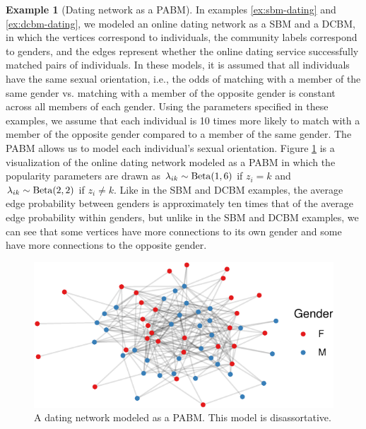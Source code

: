 \documentclass[
  12pt,
]{article}
\theoremstyle{definition}
\theoremstyle{definition}
\newtheorem{example}{Example}[section]
\theoremstyle{definition}
\theoremstyle{definition}
\theoremstyle{remark}
\begin{document}
\begin{example}[Dating network as a PABM]
\label{ex:pabm-dating}
In examples \ref{ex:sbm-dating} and \ref{ex:dcbm-dating}, we modeled an online dating network as a SBM and a DCBM, in which the vertices correspond to individuals, the community labels correspond to genders, and the edges represent whether the online dating service successfully matched pairs of individuals. 
In these models, it is assumed that all individuals have the same sexual orientation, i.e., the odds of matching with a member of the same gender vs. matching with a member of the opposite gender is constant across all members of each gender. 
Using the parameters specified in these examples, we assume that each individual is 10 times more likely to match with a member of the opposite gender compared to a member of the same gender. 
The PABM allows us to model each individual's sexual orientation. 
Figure \ref{fig:dating-pabm} is a visualization of the online dating network modeled as a PABM in which the popularity parameters are drawn as $\lambda_{ik} \sim \mathrm{Beta}(1, 6)$ if $z_i = k$ and $\lambda_{ik} \sim \mathrm{Beta}(2, 2)$ if $z_i \neq k$. 
Like in the SBM and DCBM examples, the average edge probability between genders is approximately ten times that of the average edge probability within genders, but unlike in the SBM and DCBM examples, we can see that some vertices have more connections to its own gender and some have more connections to the opposite gender. 

\begin{figure}[H]

{\centering \includegraphics{draft_files/figure-latex/dating-pabm-1} 

}

\caption{A dating network modeled as a PABM. This model is disassortative.}\label{fig:dating-pabm}
\end{figure}
\end{example}
\end{document}
